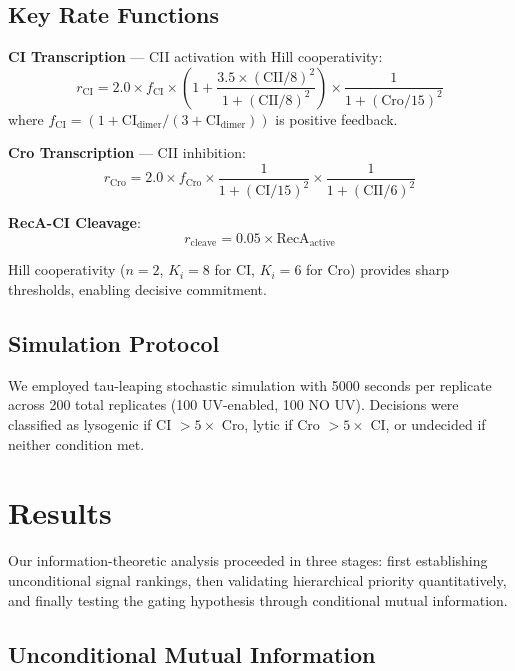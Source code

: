 \documentclass[10pt,twocolumn]{article}
\begin{document}
\subsection{Key Rate Functions}

\textbf{CI Transcription} — CII activation with Hill cooperativity:
\begin{equation}
r_{\text{CI}} = 2.0 \times f_{\text{CI}} \times \left(1 + \frac{3.5 \times (\text{CII}/8)^2}{1 + (\text{CII}/8)^2}\right) \times \frac{1}{1 + (\text{Cro}/15)^2}
\end{equation}
where $f_{\text{CI}} = (1 + \text{CI}_{\text{dimer}}/(3 + \text{CI}_{\text{dimer}}))$ is positive feedback.

\noindent\textbf{Cro Transcription} — CII inhibition:
\begin{equation}
r_{\text{Cro}} = 2.0 \times f_{\text{Cro}} \times \frac{1}{1 + (\text{CI}/15)^2} \times \frac{1}{1 + (\text{CII}/6)^2}
\end{equation}

\noindent\textbf{RecA-CI Cleavage}:
\begin{equation}
r_{\text{cleave}} = 0.05 \times \text{RecA}_{\text{active}}
\end{equation}

Hill cooperativity ($n=2$, $K_i=8$ for CI, $K_i=6$ for Cro) provides sharp thresholds, enabling decisive commitment.

\subsection{Simulation Protocol}

We employed tau-leaping stochastic simulation \cite{gillespie2001} with 5000 seconds per replicate across 200 total replicates (100 UV-enabled, 100 NO UV). Decisions were classified as lysogenic if CI $> 5 \times$ Cro, lytic if Cro $> 5 \times$ CI, or undecided if neither condition met.

\section{Results}

Our information-theoretic analysis \cite{tkacik2016,cheong2011,bowsher2014} proceeded in three stages: first establishing unconditional signal rankings, then validating hierarchical priority quantitatively, and finally testing the gating hypothesis through conditional mutual information.

\subsection{Unconditional Mutual Information}
\end{document}
